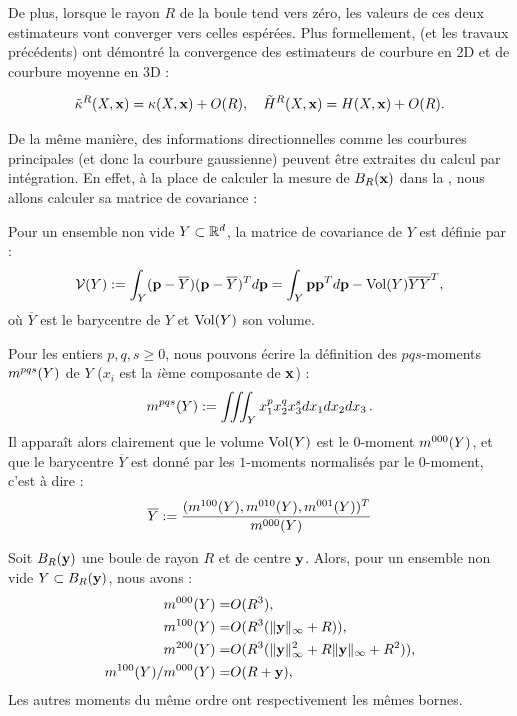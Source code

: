%
De plus, lorsque le rayon $R$ de la boule tend vers zéro, les valeurs de ces
deux estimateurs vont converger vers celles espérées. Plus formellement,
 (et les travaux précédents) ont démontré la
convergence des estimateurs de courbure en 2D et de courbure moyenne en 3D :
%
\begin{theorem}{}
  \label{theo:pottmann-2d-3d-mean-conv}
  \begin{equation}
    \tilde{\kappa}^{R}(X,\mathbf{x}) = \kappa(X,\mathbf{x}) + O(R),
    \quad\tilde{H}^{R}(X,\mathbf{x}) = H(X,\mathbf{x}) + O(R).
  \end{equation}
\end{theorem}
%
De la même manière, des informations directionnelles comme les courbures
principales (et donc la courbure gaussienne) peuvent être extraites du calcul
par intégration. En effet, à la place de calculer la mesure de $B_{R}(\mathbf{x})$
dans la , nous allons calculer sa matrice
de covariance :
%
\begin{definition}
  \label{def:cov-matrix}
  Pour un ensemble non vide $Y \subset \mathbb{R}^d$, la matrice de covariance de $Y$
  est définie par :
  \begin{equation}
    \mathcal{V}(Y) := \int_Y (\mathbf{p}-\overline{Y})(\mathbf{p}-\overline{Y})^T d\mathbf{p} = \int_Y \mathbf{p} \mathbf{p}^T d\mathbf{p} - \mathrm{Vol}(Y)\overline{Y}\overline{Y}^T,
  \end{equation}
  où $\overline{Y}$ est le barycentre de $Y$ et $\mathrm{Vol}(Y)$ son volume.
\end{definition}
%
Pour les entiers $p, q, s \ge 0$, nous pouvons écrire la définition des $
pqs$-moments $m^{pqs}(Y)$ de $Y$ ($x_i$ est la $i$ème composante de $\mathbf{x}$) :
%
\begin{equation}
  \label{eq:moments}
  m^{pqs}(Y) := \iiint_Y x_1^p x_2^q x_3^s dx_1 dx_2 dx_3\,.
\end{equation}
%
Il apparaît alors clairement que le volume $\mathrm{Vol}(Y)$ est le $0$-moment
$m^{000}(Y)$, et que le barycentre $\overline{Y}$ est donné par les $1$-moments
normalisés par le $0$-moment, c'est à dire :
%
\begin{equation}
  \overline{Y} := \frac{( m^{100}(Y), m^{010}(Y), m^{001}(Y) )^T}{m^{000}(Y)}
\end{equation}
%
\begin{lemma}\label{lem:moment-ball}
  Soit $B_{R}(\mathbf{y})$ une boule de rayon $R$ et de centre $\mathbf{y}$. Alors, pour un
  ensemble non vide $Y \subset B_{R}(\mathbf{y})$, nous avons :
  \begin{align}
    m^{000}(Y) =& O(R^3), \label{eq:ball-moment-0}\\
    m^{100}(Y) =& O(R^3(\|\mathbf{y}\|_\infty + R)), \label{eq:ball-moment-1}\\
    m^{200}(Y) =& O(R^3(\|\mathbf{y}\|^2_\infty + R\|\mathbf{y}\|_\infty + R^2)), \label{eq:ball-moment-2}\\
    m^{100}(Y)/m^{000}(Y) =& O(R+\mathbf{y}), \label{eq:ball-moment-1bis}
  \end{align}
  Les autres moments du même ordre ont respectivement les mêmes bornes.
\end{lemma}

